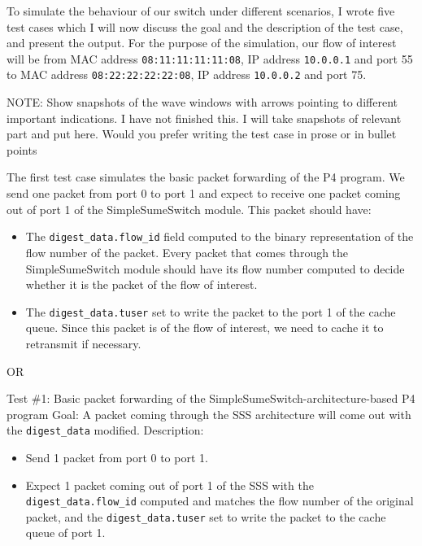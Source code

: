 To simulate the behaviour of our switch under different scenarios, I wrote five test cases which I will now discuss the goal and the description of the test case, and present the output. For the purpose of the simulation, our flow of interest will be from MAC address \texttt{08:11:11:11:11:08}, IP address \texttt{10.0.0.1} and port 55 to MAC address \texttt{08:22:22:22:22:08}, IP address \texttt{10.0.0.2} and port 75.

NOTE: Show snapshots of the wave windows with arrows pointing to different important indications. I have not finished this. I will take snapshots of relevant part and put here. Would you prefer writing the test case in prose or in bullet points 

The first test case simulates the basic packet forwarding of the P4 program. We send one packet from port 0 to port 1 and expect to receive one packet coming out of port 1 of the SimpleSumeSwitch module. This packet should have:
\begin{itemize}
	\item The \verb|digest_data.flow_id| field computed to the binary representation of the flow number of the packet. Every packet that comes through the SimpleSumeSwitch module should have its flow number computed to decide whether it is the packet of the flow of interest.
	\item The \verb|digest_data.tuser| set to write the packet to the port 1 of the cache queue. Since this packet is of the flow of interest, we need to cache it to retransmit if necessary. 
\end{itemize} 

OR

Test \#1: Basic packet forwarding of the SimpleSumeSwitch-architecture-based P4 program
Goal: A packet coming through the SSS architecture will come out with the \texttt{digest\_data} modified.
Description:
\begin{itemize}
\item Send 1 packet from port 0 to port 1.
\item Expect 1 packet coming out of port 1 of the SSS with the \texttt{digest\_data.flow\_id} computed and matches the flow number of the original packet, and the \texttt{digest\_data.tuser} set to write the packet to the cache queue of port 1.
\end{itemize}


